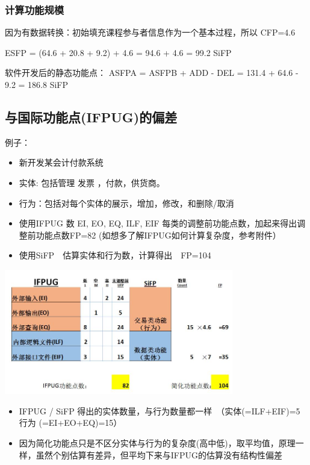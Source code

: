 \hypertarget{ux8ba1ux7b97ux529fux80fdux89c4ux6a21-1}{%
\subsubsection{计算功能规模}\label{ux8ba1ux7b97ux529fux80fdux89c4ux6a21-1}}

\begin{description}
\item[]
\end{description}

因为有数据转换：初始填充课程参与者信息作为一个基本过程，所以 CFP=4.6

\begin{description}
\tightlist
\item[]
ESFP = (64.6 + 20.8 + 9.2) + 4.6 = 94.6 + 4.6 = 99.2 SiFP
\end{description}

软件开发后的静态功能点： ASFPA = ASFPB + ADD - DEL = 131.4 + 64.6 - 9.2
= 186.8 SiFP


\hypertarget{ux4e0eux56fdux9645ux529fux80fdux70b9ifpugux7684ux504fux5dee}{%
\subsection{与国际功能点(IFPUG)的偏差}\label{ux4e0eux56fdux9645ux529fux80fdux70b9ifpugux7684ux504fux5dee}}

例子：

\begin{itemize}
\tightlist
\item
  新开发某会计付款系统
\item
  实体: 包括管理 发票 ，付款，供货商。
\item
  行为：包括对每个实体的展示，增加，修改，和删除/取消
\item
  使用IFPUG 数 EI, EO, EQ, ILF, EIF
  每类的调整前功能点数，加起来得出调整前功能点数FP=82
  (如想多了解IFPUG如何计算复杂度，参考附件）
\item
  使用SiFP　估算实体和行为数，计算得出　FP=104
\end{itemize}


\includegraphics[width=10cm]{FPAS11.jpg}

\begin{itemize}
\tightlist
\item
  IFPUG / SiFP
  得出的实体数量，与行为数量都一样　（实体(=ILF+EIF)=5　　行为
  (=EI+EO+EQ)=15）
\item
  因为简化功能点只是不区分实体与行为的复杂度(高中低)，取平均值，原理一样，虽然个别估算有差异，但平均下来与IFPUG的估算没有结构性偏差
\end{itemize}

